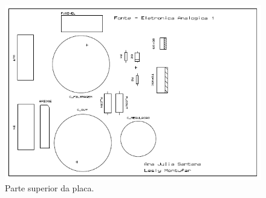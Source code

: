 \documentclass[a4paper,12pt,oneside,openany,table,xcdraw]{article}
\begin{document}
\begin{figure}[H]
\centering
\captionsetup{font=scriptsize}
\includegraphics[width=15cm]{top}
\caption{Parte superior da placa.}
\label{top}
\end{figure}
\end{document}
